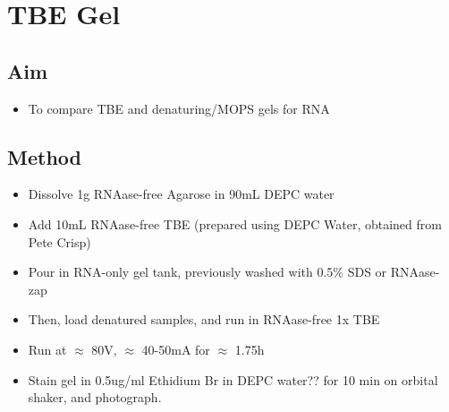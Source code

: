 \documentclass[12pt,a4paper]{book}
\begin{document}
  \section*{TBE Gel}
    \subsection*{Aim}
      \begin{itemize} \itemsep1pt \parskip0pt 
        \item To compare TBE and denaturing/MOPS gels for RNA
      \end{itemize}

    \subsection*{Method}
      \begin{itemize} \itemsep1pt \parskip0pt 
        \item Dissolve 1g RNAase-free Agarose in 90mL DEPC water
        \item Add 10mL RNAase-free TBE (prepared using DEPC Water, obtained from Pete Crisp)
        \item Pour in RNA-only gel tank, previously washed with 0.5\% SDS or RNAase-zap
        \item Then, load denatured samples, and run in RNAase-free 1x TBE
        \item Run at $\approx$ 80V, $\approx$ 40-50mA for $\approx$ 1.75h
        \item Stain gel in 0.5ug/ml Ethidium Br in DEPC water?? for 10 min on orbital shaker, and photograph.
      \end{itemize}
\end{document}
